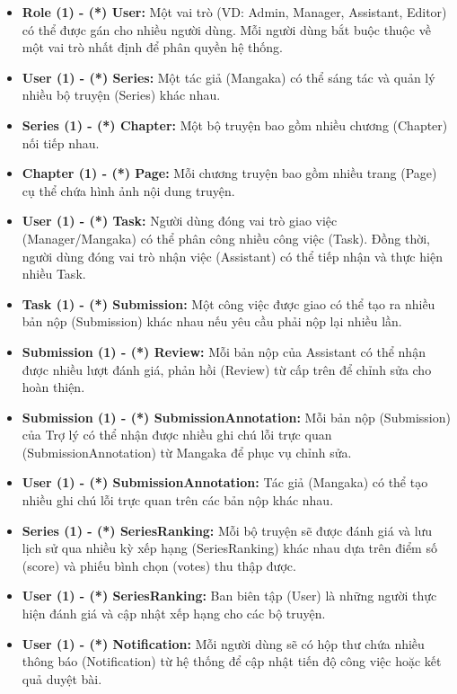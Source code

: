 \begin{itemize}
    \item \textbf{Role (1) - (*) User:} Một vai trò (VD: Admin, Manager, Assistant, Editor) có thể được gán cho nhiều người dùng. Mỗi người dùng bắt buộc thuộc về một vai trò nhất định để phân quyền hệ thống.
    \item \textbf{User (1) - (*) Series:} Một tác giả (Mangaka) có thể sáng tác và quản lý nhiều bộ truyện (Series) khác nhau.
    \item \textbf{Series (1) - (*) Chapter:} Một bộ truyện bao gồm nhiều chương (Chapter) nối tiếp nhau.
    \item \textbf{Chapter (1) - (*) Page:} Mỗi chương truyện bao gồm nhiều trang (Page) cụ thể chứa hình ảnh nội dung truyện.
    \item \textbf{User (1) - (*) Task:} Người dùng đóng vai trò giao việc (Manager/Mangaka) có thể phân công nhiều công việc (Task). Đồng thời, người dùng đóng vai trò nhận việc (Assistant) có thể tiếp nhận và thực hiện nhiều Task.
    \item \textbf{Task (1) - (*) Submission:} Một công việc được giao có thể tạo ra nhiều bản nộp (Submission) khác nhau nếu yêu cầu phải nộp lại nhiều lần.
    \item \textbf{Submission (1) - (*) Review:} Mỗi bản nộp của Assistant có thể nhận được nhiều lượt đánh giá, phản hồi (Review) từ cấp trên để chỉnh sửa cho hoàn thiện.
    \item \textbf{Submission (1) - (*) SubmissionAnnotation:} Mỗi bản nộp (Submission) của Trợ lý có thể nhận được nhiều ghi chú lỗi trực quan (SubmissionAnnotation) từ Mangaka để phục vụ chỉnh sửa.
    \item \textbf{User (1) - (*) SubmissionAnnotation:} Tác giả (Mangaka) có thể tạo nhiều ghi chú lỗi trực quan trên các bản nộp khác nhau.
    \item \textbf{Series (1) - (*) SeriesRanking:} Mỗi bộ truyện sẽ được đánh giá và lưu lịch sử qua nhiều kỳ xếp hạng (SeriesRanking) khác nhau dựa trên điểm số (score) và phiếu bình chọn (votes) thu thập được.
    \item \textbf{User (1) - (*) SeriesRanking:} Ban biên tập (User) là những người thực hiện đánh giá và cập nhật xếp hạng cho các bộ truyện.
    \item \textbf{User (1) - (*) Notification:} Mỗi người dùng sẽ có hộp thư chứa nhiều thông báo (Notification) từ hệ thống để cập nhật tiến độ công việc hoặc kết quả duyệt bài.
\end{itemize}

